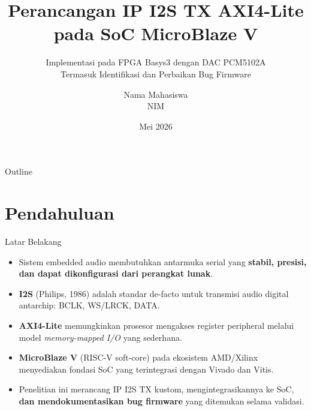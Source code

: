 \documentclass[aspectratio=169]{beamer}
\title{Perancangan IP I2S TX AXI4-Lite\\pada SoC MicroBlaze V}
\subtitle{Implementasi pada FPGA Basys3 dengan DAC PCM5102A\\
          \small Termasuk Identifikasi dan Perbaikan Bug Firmware}
\author{Nama Mahasiswa \\ NIM}
\institute{Departemen Teknik Elektro dan Teknologi Informasi\\Universitas Gadjah Mada}
\date{Mei 2026}
\begin{document}
\begin{frame}
  \titlepage
\end{frame}

\begin{frame}{Outline}
  \tableofcontents
\end{frame}

\section{Pendahuluan}

\begin{frame}{Latar Belakang}
  \begin{itemize}
    \item Sistem embedded audio membutuhkan antarmuka serial yang \textbf{stabil, presisi,
          dan dapat dikonfigurasi dari perangkat lunak}.
    \item \textbf{I2S} (Philips, 1986) adalah standar de-facto untuk transmisi audio
          digital antarchip: BCLK, WS/LRCK, DATA.
    \item \textbf{AXI4-Lite} memungkinkan prosesor mengakses register peripheral
          melalui model \textit{memory-mapped I/O} yang sederhana.
    \item \textbf{MicroBlaze V} (RISC-V soft-core) pada ekosistem AMD/Xilinx
          menyediakan fondasi SoC yang terintegrasi dengan Vivado dan Vitis.
    \item Penelitian ini merancang IP I2S TX kustom, mengintegrasikannya ke SoC,
          \textbf{dan mendokumentasikan bug firmware} yang ditemukan selama validasi.
  \end{itemize}
\end{frame}
\end{document}
